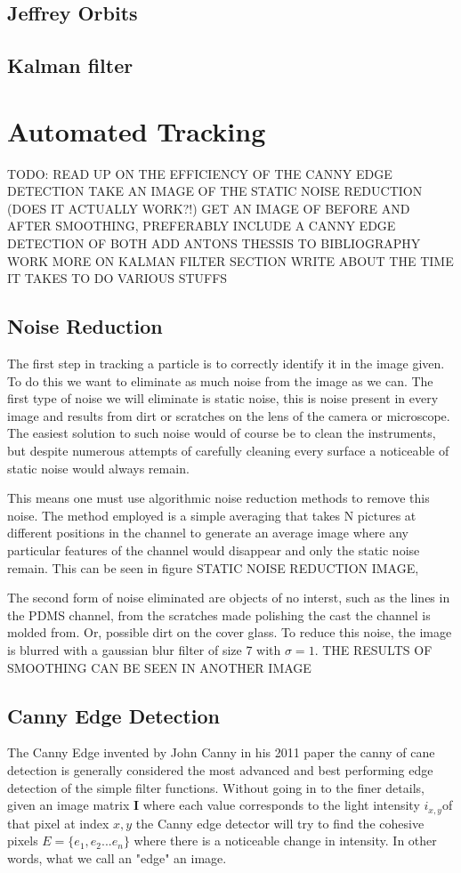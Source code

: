 \documentclass[]{report}
\begin{document}
\section{Jeffrey Orbits}

\section{Kalman filter}
\chapter{Automated Tracking}
TODO:
READ UP ON THE EFFICIENCY OF THE CANNY EDGE DETECTION
TAKE AN IMAGE OF THE STATIC NOISE REDUCTION (DOES IT ACTUALLY WORK?!)
GET AN IMAGE OF BEFORE AND AFTER SMOOTHING, PREFERABLY INCLUDE A CANNY EDGE DETECTION OF BOTH 
ADD ANTONS THESSIS TO BIBLIOGRAPHY
WORK MORE ON KALMAN FILTER SECTION
WRITE ABOUT THE TIME IT TAKES TO DO VARIOUS STUFFS

\section{Noise Reduction}
The first step in tracking a particle is to correctly identify it in the image given. To do this we want to eliminate as much noise from the image as we can. The first type of noise we will eliminate is static noise, this is noise present in every image and results from dirt or scratches on the lens of the camera or microscope. 
The easiest solution to such noise would of course be to clean the instruments, but despite numerous attempts of carefully cleaning every surface a noticeable of static noise would always remain. 

This means one must use algorithmic noise reduction methods to remove this noise. The method employed is a simple averaging that takes N pictures at different positions in the channel to generate an average image where any particular features of the channel would disappear and only the static noise remain. This can be seen in figure STATIC NOISE REDUCTION IMAGE,

The second form of noise eliminated are objects of no interst, such as the lines in the PDMS channel, from the scratches made polishing the cast the channel is molded from. Or, possible dirt on the cover glass. To reduce this noise, the image is blurred with a gaussian blur filter of size 7 with $\sigma=1$. THE RESULTS OF SMOOTHING CAN BE SEEN IN ANOTHER IMAGE

\section{Canny Edge Detection}
The Canny Edge invented by John Canny in his 2011 paper the canny of cane \cite{Canny}detection is generally considered the most advanced and best performing edge detection of the simple filter functions. 
Without going in to the finer details, given an image matrix $\mathbf{I}$ where each value corresponds to the light intensity $i_{x,y}$of that pixel at index $x,y$ the Canny edge detector will try to find the cohesive pixels $E = \{e_1, e_2... e_n\}$ where there is a noticeable change in intensity. In other words, what we call an "edge" an image. 
\end{document}
